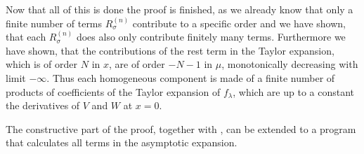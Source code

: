 \begin{MainTheorem}
\begin{Proof}

    Now that all of this is done the proof is finished, as we already know that
    only a finite number of terms $R^{(n)}_\sigma$ contribute to a specific
    order and we have shown, that each $R^{(n)}_\sigma$ does also only
    contribute finitely many terms. Furthermore we have shown, that the
    contributions of the rest term in the Taylor expansion, which is of order
    $N$ in $x$, are of order $-N-1$ in $\mu$, monotonically decreasing with
    limit $-\infty$. Thus each homogeneous component is made of a finite number
    of products of coefficients of the Taylor expansion of $f_\lambda$, which
    are up to a constant the derivatives of $V$ and $W$ at $x=0$.
  \end{Proof}
\end{MainTheorem}
The constructive part of the proof, together with , can be
extended to a program that calculates all terms in the asymptotic expansion.
